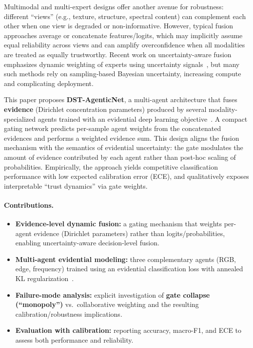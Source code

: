 \documentclass[10pt]{article}
\begin{document}
Multimodal and multi-expert designs offer another avenue for robustness: different ``views'' (e.g., texture, structure, spectral content) can complement each other when one view is degraded or non-informative. However, typical fusion approaches average or concatenate features/logits, which may implicitly assume equal reliability across views and can amplify overconfidence when all modalities are treated as equally trustworthy. Recent work on uncertainty-aware fusion emphasizes dynamic weighting of experts using uncertainty signals~\cite{lou2023,tian2020}, but many such methods rely on sampling-based Bayesian uncertainty, increasing compute and complicating deployment.

This paper proposes \textbf{DST-AgenticNet}, a multi-agent architecture that fuses \textbf{evidence} (Dirichlet concentration parameters) produced by several modality-specialized agents trained with an evidential deep learning objective~\cite{sensoy2018}. A compact gating network predicts per-sample agent weights from the concatenated evidences and performs a weighted evidence sum. This design aligns the fusion mechanism with the semantics of evidential uncertainty: the gate modulates the amount of evidence contributed by each agent rather than post-hoc scaling of probabilities. Empirically, the approach yields competitive classification performance with low expected calibration error (ECE), and qualitatively exposes interpretable ``trust dynamics'' via gate weights.

\paragraph{Contributions.}
\begin{itemize}
  \item \textbf{Evidence-level dynamic fusion:} a gating mechanism that weights per-agent evidence (Dirichlet parameters) rather than logits/probabilities, enabling uncertainty-aware decision-level fusion.
  \item \textbf{Multi-agent evidential modeling:} three complementary agents (RGB, edge, frequency) trained using an evidential classification loss with annealed KL regularization~\cite{sensoy2018}.
  \item \textbf{Failure-mode analysis:} explicit investigation of \textbf{gate collapse (``monopoly'')} vs.\ collaborative weighting and the resulting calibration/robustness implications.
  \item \textbf{Evaluation with calibration:} reporting accuracy, macro-F1, and ECE to assess both performance and reliability.
\end{itemize}
\end{document}

